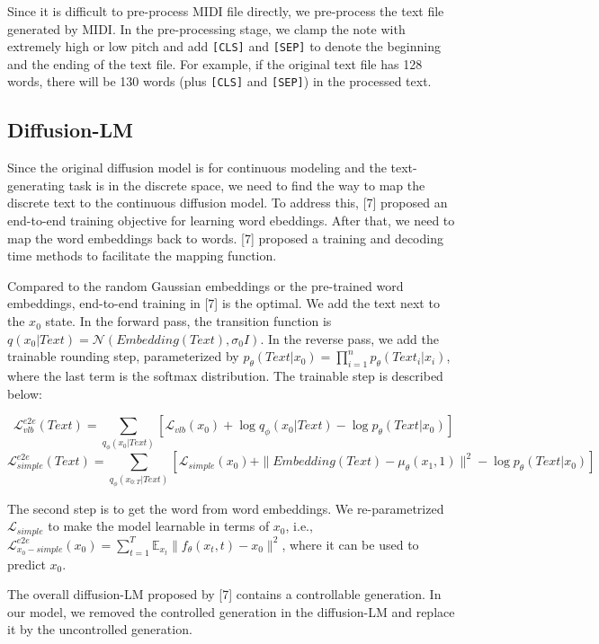 \documentclass{article}
\begin{document}
Since it is difficult to pre-process MIDI file directly, we pre-process the text file generated by MIDI. In the pre-processing stage, we clamp the note with extremely high or low pitch and add {\tt{[CLS]}} and {\tt{[SEP]}} to denote the beginning and the ending of the text file. For example, if the original text file has 128 words, there will be 130 words (plus {\tt{[CLS]}} and {\tt{[SEP]}}) in the processed text. 

\subsection{Diffusion-LM}

Since the original diffusion model is for continuous modeling and the text-generating task is in the discrete space, we need to find the way to map the discrete text to the continuous diffusion model. To address this, [7] proposed an end-to-end training objective for learning word ebeddings. After that, we need to map the word embeddings back to words. [7] proposed a training and decoding time methods to facilitate the mapping function. 

Compared to the random Gaussian embeddings or the pre-trained word embeddings, end-to-end training in [7] is the optimal. We add the text next to the $x_0$ state. In the forward pass, the transition function is $q(x_0|Text) = \mathcal{N}(Embedding(Text), \sigma_0 I )$. In the reverse pass, we add the trainable rounding step, parameterized by $p_{\theta}(Text|x_0) = \prod\limits_{i=1}^{n} p_{\theta}(Text_i|x_i)$, where the last term is the softmax distribution. The trainable step is described below:

$$\mathcal{L}_{vlb}^{e2e}(Text) = \sum\limits_{q_{\phi}(x_0 | Text)}
[\mathcal{L}_{vlb}(x_0) + \log q_{\phi}(x_0|Text) - \log p_{\theta}(Text|x_0)]$$
$$\mathcal{L}_{simple}^{e2e}(Text) = \sum\limits_{q_{\phi}(x_{0:T} | Text)}
[\mathcal{L}_{simple}(x_0) + \|Embedding(Text) - \mu_{\theta}(x_1, 1)\|^2
- \log p_{\theta}(Text|x_0)]$$

The second step is to get the word from word embeddings. We re-parametrized $\mathcal{L}_{simple}$ to make the model learnable in terms of $x_0$, i.e., 
$\mathcal{L}_{x_0-simple}^{e2e}(x_0) 
= \sum\limits_{t=1}^{T}\mathbb{E}_{x_t}\|f_{\theta}(x_t, t) - x_0\|^2$, where it can be used to predict $x_0$.

The overall diffusion-LM proposed by [7] contains a controllable generation. In our model, we removed the controlled generation in the diffusion-LM and replace it by the uncontrolled generation. 
\end{document}
